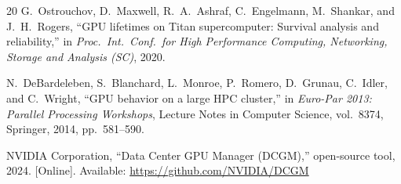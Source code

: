 \documentclass[conference]{IEEEtran}
\begin{document}
\begin{thebibliography}{20}
G.~Ostrouchov, D.~Maxwell, R.~A.~Ashraf, C.~Engelmann, M.~Shankar,
and J.~H.~Rogers, ``GPU lifetimes on Titan supercomputer: Survival
analysis and reliability,'' in \emph{Proc.\ Int.\ Conf.\ for High
Performance Computing, Networking, Storage and Analysis (SC)}, 2020.

N.~DeBardeleben, S.~Blanchard, L.~Monroe, P.~Romero, D.~Grunau,
C.~Idler, and C.~Wright, ``GPU behavior on a large HPC cluster,'' in
\emph{Euro-Par 2013: Parallel Processing Workshops}, Lecture Notes in
Computer Science, vol.~8374, Springer, 2014, pp.~581--590.

NVIDIA Corporation, ``Data Center GPU Manager (DCGM),'' open-source
tool, 2024. [Online]. Available: \url{https://github.com/NVIDIA/DCGM}

\end{thebibliography}
\end{document}
